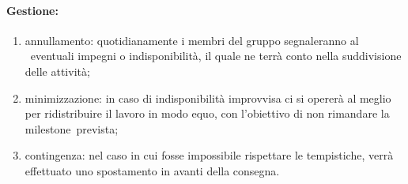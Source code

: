 \documentclass[../PianoProgetto.tex]{subfiles}
\begin{document}
	\paragraph*{Gestione:}
	\begin{enumerate}
		\item annullamento: quotidianamente i membri del gruppo segnaleranno al \responsabilediprogetto\ eventuali impegni o indisponibilità, il quale ne terrà conto nella suddivisione delle attività;
		\item minimizzazione: in caso di indisponibilità improvvisa ci si opererà al meglio per ridistribuire il lavoro in modo equo, con l'obiettivo di non rimandare la milestone\g\ prevista;
		\item contingenza: nel caso in cui fosse impossibile rispettare le tempistiche, verrà effettuato uno spostamento in avanti della consegna.
	\end{enumerate}
		
		
\end{document}
